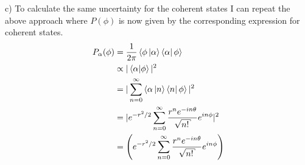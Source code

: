 \begin{homeworkProblem}[Problem 9]
\begin{homeworkSection}{c)}
      To calculate the same uncertainty for the coherent states I can repeat the
      above approach where $ P(\phi) $ is now given by the corresponding expression
      for coherent states.
      \begin{align}
         P_{\alpha}(\phi) &= \frac{1}{2 \pi} \braket{\phi \ket{\alpha} \bra{\alpha}
         \phi} \\
         & \propto | \braket{\alpha | \phi} |^2 \\
         &= | \sum^{\infty}_{n=0}  \braket{\alpha \ket{n} \bra{n} \phi} |^2 \\
         &= | e^{{-r^{2}}/2} \sum^{\infty}_{n=0}
         \frac{r^{n}e^{-i n \theta}}{\sqrt{n!}} e^{i n \phi}|^2 \\
         &=
         \left(
            e^{{-r^{2}}/2} \sum^{\infty}_{n=0}
            \frac{r^{n}e^{-i n \theta}}{\sqrt{n!}} e^{i n \phi}
         \right)

\end{align}
\end{homeworkSection}
\end{homeworkProblem}
